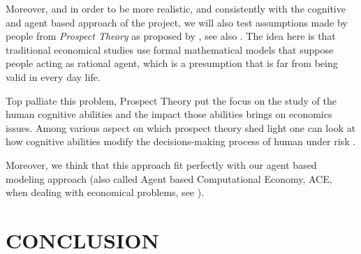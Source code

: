 \documentclass{wscpaperproc}
\begin{document}
Moreover, and in order to be more realistic, and consistently with the cognitive and agent based approach of the project, we will also test assumptions made by people from \emph{Prospect Theory} as proposed by 
\cite{kahneman_prospect_1979}, see also
\cite{camerer_prospect_2004}. The idea here is that traditional economical studies use formal mathematical models that suppose people acting as rational agent, which is a presumption that is far from being valid  in every day life. 

Top palliate this problem, Prospect Theory put the focus on the study of the human cognitive abilities and the impact those abilities brings on economics issues. Among various aspect on which prospect theory shed light one can look at how cognitive abilities modify the decisions-making process of human under risk
\cite{weber_disposition_1998}.

Moreover, we think that this approach fit perfectly with our agent based modeling approach (also called Agent based Computational Economy, ACE, when dealing with economical problems, see
\cite{tesfatsion_introduction_2001}).


\section{CONCLUSION}





  
\end{document}

